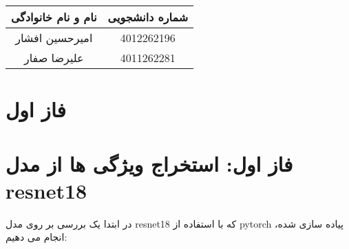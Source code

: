 \documentclass[a4paper,12pt]{article}
\begin{document}
	
	\begin{table}[h]
		\centering
		\begin{tabular}{|c|c|}
			\hline
			\textbf{نام و نام خانوادگی} & \textbf{شماره دانشجویی} \\
			\hline
			امیرحسین افشار & 4012262196 \\
			\hline
						علیرضا صفار & 4011262281 \\
			\hline
		\end{tabular}
	\end{table}
	


	
\section{فاز اول}
\section*{فاز اول: استخراج ویژگی ها از مدل resnet18}

در ابتدا یک بررسی بر روی مدل resnet18 که با استفاده از pytorch پیاده سازی شده، انجام می دهیم:
\end{document}
